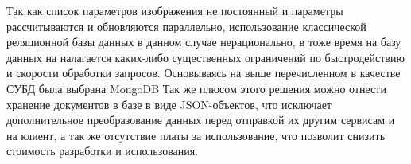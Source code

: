 Так как список параметров изображения не постоянный и параметры рассчитываются и обновляются параллельно, использование классической реляционной базы данных в данном случае нерационально, в тоже время на базу данных на налагается каких-либо существенных ограничений по быстродействию и скорости обработки запросов. Основываясь на выше перечисленном в качестве СУБД была выбрана MongoDB
Так же плюсом этого решения можно отнести хранение документов в базе в виде JSON-объектов, что исключает дополнительное преобразование данных перед отправкой их другим сервисам и на клиент, а так же отсутствие платы за использование, что позволит снизить стоимость разработки и использования.